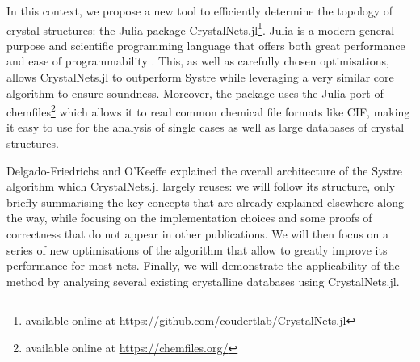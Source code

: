 \documentclass[main.tex]{subfiles}
\begin{document}

\medskip

In this context, we propose a new tool to efficiently determine the topology of crystal structures: the Julia package CrystalNets.jl\footnote{available online at https://github.com/coudertlab/CrystalNets.jl}. Julia \autocite{Julia} is a modern general-purpose and scientific programming language that offers both great performance and ease of programmability \autocite{JuliaDesign}. This, as well as carefully chosen optimisations, allows CrystalNets.jl to outperform Systre while leveraging a very similar core algorithm to ensure soundness. Moreover, the package uses the Julia port of chemfiles\footnote{available online at \url{https://chemfiles.org/}} which allows it to read common chemical file formats like CIF, making it easy to use for the analysis of single cases as well as large databases of crystal structures.

Delgado-Friedrichs and O'Keeffe \autocite{Systre} explained the overall architecture of the Systre algorithm which CrystalNets.jl largely reuses: we will follow its structure, only briefly summarising the key concepts that are already explained elsewhere along the way, while focusing on the implementation choices and some proofs of correctness that do not appear in other publications. We will then focus on a series of new optimisations of the algorithm that allow to greatly improve its performance for most nets. Finally, we will demonstrate the applicability of the method by analysing several existing crystalline databases using CrystalNets.jl.
\end{document}
